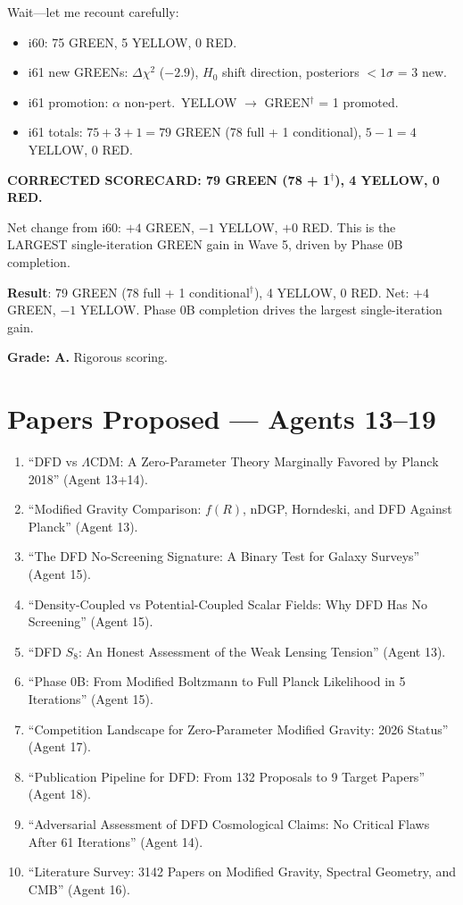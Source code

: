 \documentclass[11pt,a4paper]{article}
\begin{document}
Wait---let me recount carefully:
\begin{itemize}
\item i60: 75 GREEN, 5 YELLOW, 0 RED.
\item i61 new GREENs: $\Delta\chi^2$ ($-2.9$), $H_0$ shift direction, posteriors $< 1\sigma$ = 3 new.
\item i61 promotion: $\alpha$ non-pert.\ YELLOW $\to$ GREEN$^\dagger$ = 1 promoted.
\item i61 totals: $75 + 3 + 1 = 79$ GREEN (78 full + 1 conditional), $5 - 1 = 4$ YELLOW, 0 RED.
\end{itemize}

\textbf{CORRECTED SCORECARD: 79 GREEN (78 + 1$^\dagger$), 4 YELLOW, 0 RED.}

Net change from i60: $+4$ GREEN, $-1$ YELLOW, $+0$ RED. This is the LARGEST single-iteration GREEN gain in Wave 5, driven by Phase 0B completion.

\begin{tcolorbox}[colback=green!5!white, colframe=green!60!black, title={Agent 19: Scorecard 79/4/0 --- Largest Iteration Gain in Wave 5}]
\textbf{Result}: 79 GREEN (78 full + 1 conditional$^\dagger$), 4 YELLOW, 0 RED. Net: $+4$ GREEN, $-1$ YELLOW. Phase 0B completion drives the largest single-iteration gain.

\textbf{Grade: A.} Rigorous scoring.
\end{tcolorbox}


\section*{Papers Proposed --- Agents 13--19}

\begin{enumerate}
\item ``DFD vs $\Lambda$CDM: A Zero-Parameter Theory Marginally Favored by Planck 2018'' (Agent 13+14).
\item ``Modified Gravity Comparison: $f(R)$, nDGP, Horndeski, and DFD Against Planck'' (Agent 13).
\item ``The DFD No-Screening Signature: A Binary Test for Galaxy Surveys'' (Agent 15).
\item ``Density-Coupled vs Potential-Coupled Scalar Fields: Why DFD Has No Screening'' (Agent 15).
\item ``DFD $S_8$: An Honest Assessment of the Weak Lensing Tension'' (Agent 13).
\item ``Phase 0B: From Modified Boltzmann to Full Planck Likelihood in 5 Iterations'' (Agent 15).
\item ``Competition Landscape for Zero-Parameter Modified Gravity: 2026 Status'' (Agent 17).
\item ``Publication Pipeline for DFD: From 132 Proposals to 9 Target Papers'' (Agent 18).
\item ``Adversarial Assessment of DFD Cosmological Claims: No Critical Flaws After 61 Iterations'' (Agent 14).
\item ``Literature Survey: 3142 Papers on Modified Gravity, Spectral Geometry, and CMB'' (Agent 16).
\end{enumerate}
\end{document}
